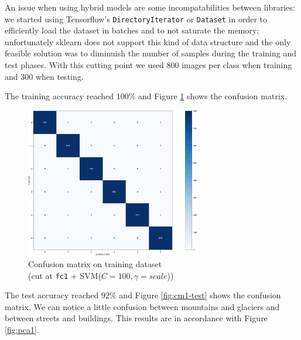 \documentclass[compsoc]{IEEEtran}
\begin{document}
An issue when using hybrid models are some incompatabilities between libraries: we started using Tensorflow's \texttt{DirectoryIterator} or \texttt{Dataset} in order to efficiently load the dataset in batches and to not saturate the memory; unfortunately sklearn does not support this kind of data structure and the only feasible solution was to diminuish the number of samples during the training and test phases. With this cutting point we used $800$ images per class when training and $300$ when testing. \par
The training accuracy reached $100\%$ and Figure \ref{fig:cm1-train} shows the confusion matrix. 


\begin{figure}[ht!]
\centering                                                                        
\includegraphics[width=3in]{../images/cm1-train.png}
\captionsetup{justification=centering}                                                                                         
\caption{Confusion matrix on training dataset \\ (cut at \texttt{fc1} + SVM($C=100, \gamma=scale$))}
\label{fig:cm1-train}                                                                                                                               
\end{figure}

The test accuracy reached $92\%$ and Figure \ref{fig:cm1-test} shows the confusion matrix. We can notice a little confusion between mountains and glaciers and between streets and buildings. This results are in accordance with Figure \ref{fig:pca1}.
\end{document}
